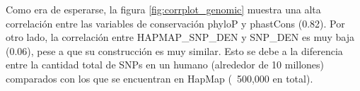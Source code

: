 


Como era de esperarse, la figura \ref{fig:corrplot_genomic} muestra una alta correlación entre las variables de conservación phyloP y phastCons (0.82). Por otro lado, la correlación entre HAPMAP\_SNP\_DEN y SNP\_DEN es muy baja (0.06), pese a que su construcción es muy similar. Esto se debe a la diferencia entre la cantidad total de SNPs en un humano (alrededor de 10 millones) comparados con los que se encuentran en HapMap (~500,000 en total).

